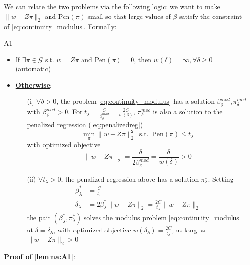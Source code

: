 \documentclass[twoside]{article}
\theoremstyle{definition}
\begin{document}
We can relate the two problems via the following logic: we want to make $\lVert w-Z\pi \rVert_2$ and $\mathrm{Pen}(\pi)$ small so that large values of $\beta$ satisfy the constraint of \ref{eq:continuity_modulus}. Formally:
\begin{lemma}{}{A1}
  \begin{itemize}
    \item If $\exists \pi \in\mathcal{G}$ s.t. $w=Z\pi$ and $\mathrm{Pen}(\pi)=0$, then $w(\delta)=\infty,\forall \delta\geq 0$ \hfill (automatic)
    \item \textbf{\underline{Otherwise}}:
    \begin{itemize}
      \item[(i)] $\forall \delta>0$, the problem \ref{eq:continuity_modulus} has a solution $\beta^{mod}_{\delta},\pi^{mod}_{\delta}$ with $\beta^{mod}_{\delta}>0$. For $t_{\lambda}=\frac{C}{\beta^{mod}_{\delta}}=\frac{2C}{w(\delta)}$, $\pi^{mod}_{\delta}$ is also a solution to the penalized regression (\ref{eq:penalizedreg})
      $$ \min_{\pi}\lVert w-Z\pi \rVert^2_2 \ \text{ s.t. }\ \mathrm{Pen}(\pi)\leq t_{\lambda} $$
      with optimized objective 
      $$ \lVert w-Z\pi \rVert_2 = \frac{\delta}{2\beta_{\delta}^{mod}}=\frac{\delta}{w(\delta)} >0$$

      \item[(ii)] $\forall t_{\lambda}>0$, the penalized regression above has a solution $\pi^{\star}_{\lambda}$. Setting
      \begin{align*}
        \beta^*_{\lambda} &=\frac{C}{t_{\lambda}} \\
        \delta_{\lambda} &=2\beta^*_{\lambda}\lVert w-Z\pi \rVert_2 = \frac{2C}{t_{\lambda}}\lVert w-Z\pi \rVert_2
      \end{align*}
      the pair $\left(\beta^*_{\lambda},\pi^*_{\lambda}\right)$ solves the modulus problem \ref{eq:continuity_modulus} at $\delta=\delta_{\lambda}$, with optimized objective $w(\delta_{\lambda})=\frac{2C}{t_{\lambda}}$, as long as $\lVert w-Z\pi \rVert_2 >0$
    \end{itemize}
  \end{itemize}
\end{lemma}

\underline{\textbf{Proof of \ref{lemma:A1}}}: 


\newpage


\end{document}

